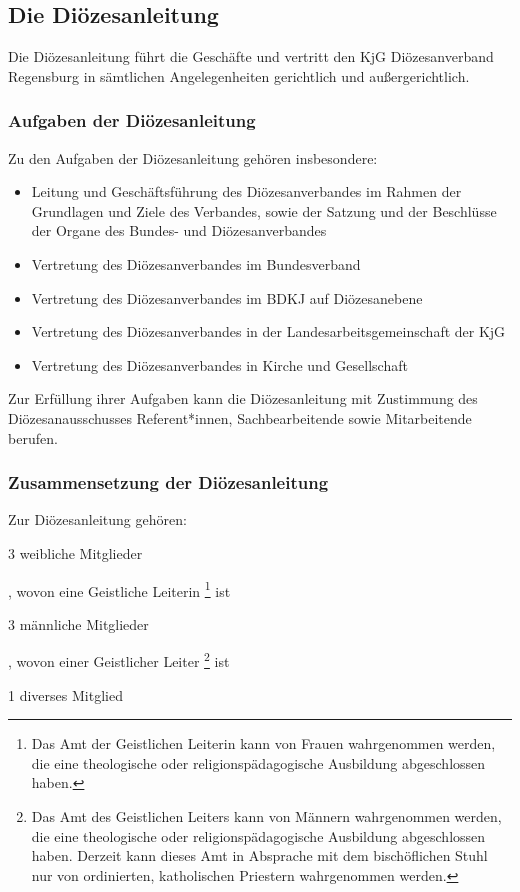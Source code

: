 \documentclass[12pt]{report}
\begin{document}
\begin{flushleft}
\subsection{Die Diözesanleitung}
Die Diözesanleitung führt die Geschäfte und vertritt den KjG Diözesanverband Regensburg in sämtlichen
Angelegenheiten gerichtlich und außergerichtlich.
\subsubsection{Aufgaben der Diözesanleitung}
Zu den Aufgaben der Diözesanleitung gehören insbesondere:
\begin{itemize}
  \item Leitung und Geschäftsführung des Diözesanverbandes im Rahmen der Grundlagen und Ziele
        des Verbandes, sowie der Satzung und der Beschlüsse der Organe des Bundes- und Diözesanverbandes
  \item Vertretung des Diözesanverbandes im Bundesverband
  \item Vertretung des Diözesanverbandes im BDKJ auf Diözesanebene
  \item Vertretung des Diözesanverbandes in der Landesarbeitsgemeinschaft der KjG
  \item Vertretung des Diözesanverbandes in Kirche und Gesellschaft
\end{itemize}

Zur Erfüllung ihrer Aufgaben kann die Diözesanleitung mit Zustimmung des Diözesanausschusses
Referent*innen, Sachbearbeitende sowie Mitarbeitende berufen.

\subsubsection{Zusammensetzung der Diözesanleitung}
Zur Diözesanleitung gehören:
\begin{itemize}
  {\item 3 weibliche Mitglieder}, wovon eine Geistliche Leiterin 
       \footnote{
           Das Amt der Geistlichen Leiterin kann von Frauen wahrgenommen werden, die eine theologische
           oder religionspädagogische Ausbildung abgeschlossen haben.
       }
       ist
  {\item 3 männliche Mitglieder}, wovon einer Geistlicher Leiter
        \footnote{
            Das Amt des Geistlichen Leiters kann von Männern wahrgenommen werden, die eine theologische
            oder religionspädagogische Ausbildung abgeschlossen haben. Derzeit kann dieses Amt in Absprache
            mit dem bischöflichen Stuhl nur von ordinierten, katholischen Priestern wahrgenommen werden.	
        }
        ist
    {\item 1 diverses Mitglied}
\end{itemize}


\end{flushleft}
\end{document}
